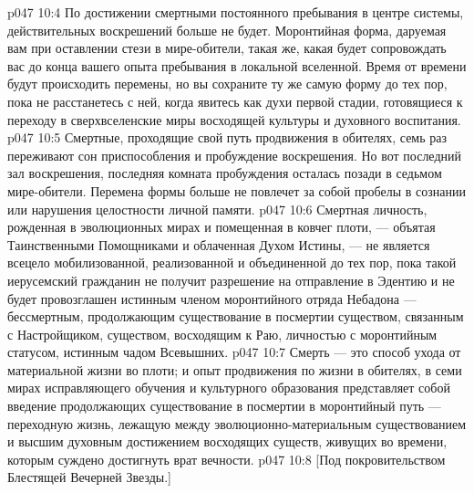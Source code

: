\vs p047 10:4 \pc По достижении смертными постоянного пребывания в центре системы, действительных воскрешений больше не будет. Моронтийная форма, даруемая вам при оставлении стези в мире\hyp{}обители, такая же, какая будет сопровождать вас до конца вашего опыта пребывания в локальной вселенной. Время от времени будут происходить перемены, но вы сохраните ту же самую форму до тех пор, пока не расстанетесь с ней, когда явитесь как духи первой стадии, готовящиеся к переходу в сверхвселенские миры восходящей культуры и духовного воспитания.
\vs p047 10:5 Смертные, проходящие свой путь продвижения в обителях, семь раз переживают сон приспособления и пробуждение воскрешения. Но вот последний зал воскрешения, последняя комната пробуждения осталась позади в седьмом мире\hyp{}обители. Перемена формы больше не повлечет за собой пробелы в сознании или нарушения целостности личной памяти.
\vs p047 10:6 \pc Смертная личность, рожденная в эволюционных мирах и помещенная в ковчег плоти, --- объятая Таинственными Помощниками и облаченная Духом Истины, --- не является всецело мобилизованной, реализованной и объединенной до тех пор, пока такой иерусемский гражданин не получит разрешение на отправление в Эдентию и не будет провозглашен истинным членом моронтийного отряда Небадона --- бессмертным, продолжающим существование в посмертии существом, связанным с Настройщиком, существом, восходящим к Раю, личностью с моронтийным статусом, истинным чадом Всевышних.
\vs p047 10:7 \pc Смерть --- это способ ухода от материальной жизни во плоти; и опыт продвижения по жизни в обителях, в семи мирах исправляющего обучения и культурного образования представляет собой введение продолжающих существование в посмертии в моронтийный путь --- переходную жизнь, лежащую между эволюционно\hyp{}материальным существованием и высшим духовным достижением восходящих существ, живущих во времени, которым суждено достигнуть врат вечности.
\vsetoff
\vs p047 10:8 [Под покровительством Блестящей Вечерней Звезды.]
